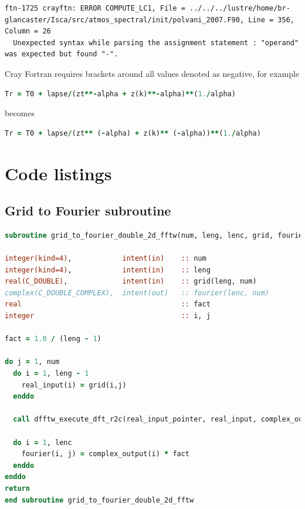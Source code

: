 \documentclass[a4paper,11pt]{report}
\begin{document}
\begin{lstlisting}
ftn-1725 crayftn: ERROR COMPUTE_LC1, File = ../../../lustre/home/br-glancaster/Isca/src/atmos_spectral/init/polvani_2007.F90, Line = 356, Column = 26 
  Unexpected syntax while parsing the assignment statement : "operand" was expected but found "-".
\end{lstlisting}
Cray Fortran requires brackets around all values denoted as negative, for example
\begin{lstlisting}[language=Fortran]
Tr = T0 + lapse/(zt**-alpha + z(k)**-alpha)**(1./alpha)
\end{lstlisting}
becomes 
\begin{lstlisting}[language=Fortran]
Tr = T0 + lapse/(zt** (-alpha) + z(k)** (-alpha))**(1./alpha)
\end{lstlisting}


\chapter{Code listings}
\label{apdx:codelisting}

\section*{Grid to Fourier subroutine}

\begin{lstlisting}[language=Fortran,caption={Code used to perform an FFT using the FFTW library. This subroutine can be found in the new \texttt{fftw.F90} module, and transforms a 2D data structure from the spacial domain to frequency domain.}]
subroutine grid_to_fourier_double_2d_fftw(num, leng, lenc, grid, fourier)

integer(kind=4),            intent(in)    :: num    
integer(kind=4),            intent(in)    :: leng   
real(C_DOUBLE),             intent(in)    :: grid(leng, num)
complex(C_DOUBLE_COMPLEX),  intent(out)   :: fourier(lenc, num)
real                                      :: fact 
integer                                   :: i, j

fact = 1.0 / (leng - 1)

do j = 1, num
  do i = 1, leng - 1
    real_input(i) = grid(i,j)
  enddo

  call dfftw_execute_dft_r2c(real_input_pointer, real_input, complex_output)

  do i = 1, lenc
    fourier(i, j) = complex_output(i) * fact
  enddo
enddo
return
end subroutine grid_to_fourier_double_2d_fftw
\end{lstlisting}
\end{document}
